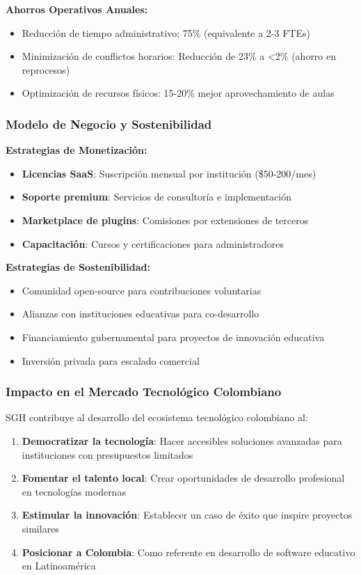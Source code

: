 \textbf{Ahorros Operativos Anuales:}
\begin{itemize}
\item Reducción de tiempo administrativo: 75\% (equivalente a 2-3 FTEs)
\item Minimización de conflictos horarios: Reducción de 23\% a <2\% (ahorro en reprocesos)
\item Optimización de recursos físicos: 15-20\% mejor aprovechamiento de aulas
\end{itemize}

\subsubsection{Modelo de Negocio y Sostenibilidad}

\textbf{Estrategias de Monetización:}
\begin{itemize}
\item \textbf{Licencias SaaS}: Suscripción mensual por institución (\$50-200/mes)
\item \textbf{Soporte premium}: Servicios de consultoría e implementación
\item \textbf{Marketplace de plugins}: Comisiones por extensiones de terceros
\item \textbf{Capacitación}: Cursos y certificaciones para administradores
\end{itemize}

\textbf{Estrategias de Sostenibilidad:}
\begin{itemize}
\item Comunidad open-source para contribuciones voluntarias
\item Alianzas con instituciones educativas para co-desarrollo
\item Financiamiento gubernamental para proyectos de innovación educativa
\item Inversión privada para escalado comercial
\end{itemize}

\subsubsection{Impacto en el Mercado Tecnológico Colombiano}

SGH contribuye al desarrollo del ecosistema tecnológico colombiano al:

\begin{enumerate}
\item \textbf{Democratizar la tecnología}: Hacer accesibles soluciones avanzadas para instituciones con presupuestos limitados
\item \textbf{Fomentar el talento local}: Crear oportunidades de desarrollo profesional en tecnologías modernas
\item \textbf{Estimular la innovación}: Establecer un caso de éxito que inspire proyectos similares
\item \textbf{Posicionar a Colombia}: Como referente en desarrollo de software educativo en Latinoamérica
\end{enumerate}


